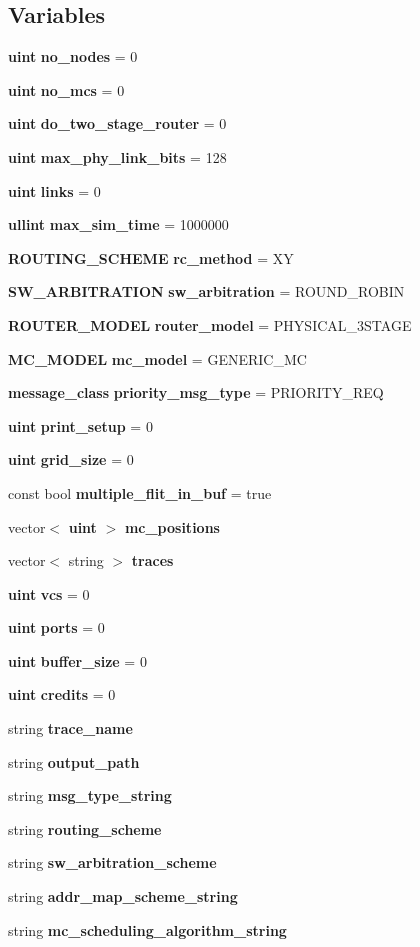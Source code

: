 \subsection*{Variables}
\begin{CompactItemize}
\item 
{\bf uint} {\bf no\_\-nodes} = 0
\item 
{\bf uint} {\bf no\_\-mcs} = 0
\item 
{\bf uint} {\bf do\_\-two\_\-stage\_\-router} = 0
\item 
{\bf uint} {\bf max\_\-phy\_\-link\_\-bits} = 128
\item 
{\bf uint} {\bf links} = 0
\item 
{\bf ullint} {\bf max\_\-sim\_\-time} = 1000000
\item 
{\bf ROUTING\_\-SCHEME} {\bf rc\_\-method} = XY
\item 
{\bf SW\_\-ARBITRATION} {\bf sw\_\-arbitration} = ROUND\_\-ROBIN
\item 
{\bf ROUTER\_\-MODEL} {\bf router\_\-model} = PHYSICAL\_\-3STAGE
\item 
{\bf MC\_\-MODEL} {\bf mc\_\-model} = GENERIC\_\-MC
\item 
{\bf message\_\-class} {\bf priority\_\-msg\_\-type} = PRIORITY\_\-REQ
\item 
{\bf uint} {\bf print\_\-setup} = 0
\item 
{\bf uint} {\bf grid\_\-size} = 0
\item 
const bool {\bf multiple\_\-flit\_\-in\_\-buf} = true
\item 
vector$<$ {\bf uint} $>$ {\bf mc\_\-positions}
\item 
vector$<$ string $>$ {\bf traces}
\item 
{\bf uint} {\bf vcs} = 0
\item 
{\bf uint} {\bf ports} = 0
\item 
{\bf uint} {\bf buffer\_\-size} = 0
\item 
{\bf uint} {\bf credits} = 0
\item 
string {\bf trace\_\-name}
\item 
string {\bf output\_\-path}
\item 
string {\bf msg\_\-type\_\-string}
\item 
string {\bf routing\_\-scheme}
\item 
string {\bf sw\_\-arbitration\_\-scheme}
\item 
string {\bf addr\_\-map\_\-scheme\_\-string}
\item 
string {\bf mc\_\-scheduling\_\-algorithm\_\-string}

\end{CompactItemize}
